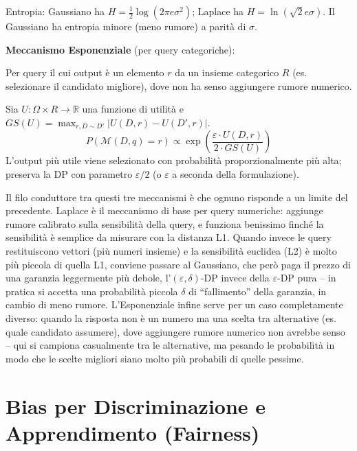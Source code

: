 \documentclass[a4paper,11pt]{article}
\begin{document}
Entropia: Gaussiano ha $H = \frac{1}{2}\log(2\pi e \sigma^2)$; Laplace ha $H = \ln(\sqrt{2}e\sigma)$. Il Gaussiano ha entropia minore (meno rumore) a parit\`{a} di $\sigma$.

\textbf{Meccanismo Esponenziale} (per query categoriche):

Per query il cui output \`{e} un elemento $r$ da un insieme categorico $R$ (es. selezionare il candidato migliore), dove non ha senso aggiungere rumore numerico.

Sia $U: \Omega \times R \to \mathbb{R}$ una funzione di utilit\`{a} e $GS(U) = \max_{r, D \sim D'} |U(D,r) - U(D',r)|$.
\[
P(\mathcal{M}(D,q) = r) \propto \exp\!\left(\frac{\varepsilon \cdot U(D, r)}{2 \cdot GS(U)}\right)
\]
L'output pi\`{u} utile viene selezionato con probabilit\`{a} proporzionalmente pi\`{u} alta; preserva la DP con parametro $\varepsilon/2$ (o $\varepsilon$ a seconda della formulazione).

\begin{nota}
Il filo conduttore tra questi tre meccanismi \`{e} che ognuno risponde a un limite del precedente. Laplace \`{e} il meccanismo di base per query numeriche: aggiunge rumore calibrato sulla sensibilit\`{a} della query, e funziona benissimo finch\'{e} la sensibilit\`{a} \`{e} semplice da misurare con la distanza L1. Quando invece le query restituiscono vettori (pi\`{u} numeri insieme) e la sensibilit\`{a} euclidea (L2) \`{e} molto pi\`{u} piccola di quella L1, conviene passare al Gaussiano, che per\`{o} paga il prezzo di una garanzia leggermente pi\`{u} debole, l'$(\varepsilon,\delta)$-DP invece della $\varepsilon$-DP pura -- in pratica si accetta una probabilit\`{a} piccola $\delta$ di ``fallimento'' della garanzia, in cambio di meno rumore. L'Esponenziale infine serve per un caso completamente diverso: quando la risposta non \`{e} un numero ma una scelta tra alternative (es. quale candidato assumere), dove aggiungere rumore numerico non avrebbe senso -- qui si campiona casualmente tra le alternative, ma pesando le probabilit\`{a} in modo che le scelte migliori siano molto pi\`{u} probabili di quelle pessime.
\end{nota}

\section{Bias per Discriminazione e Apprendimento (Fairness)}
\end{document}
